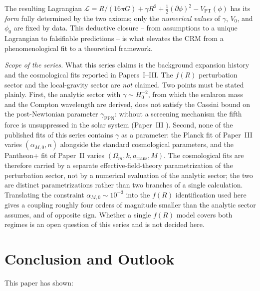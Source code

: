 \documentclass[aps,prd,twocolumn,superscriptaddress,nofootinbib]{revtex4-2}
\begin{document}
The resulting Lagrangian $\mathcal{L} = R/(16\pi G) + \gamma R^2 + \frac{1}{2}(\partial\phi)^2 - V_{\mathrm{PT}}(\phi)$ has its \textit{form} fully determined by the two axioms; only the \textit{numerical values} of $\gamma$, $V_0$, and $\phi_0$ are fixed by data. This deductive closure -- from assumptions to a unique Lagrangian to falsifiable predictions -- is what elevates the CRM from a phenomenological fit to a theoretical framework.

\textit{Scope of the series.} What this series claims is the background expansion history and the cosmological fits reported in Papers~I--III. The $f(R)$ perturbation sector and the local-gravity sector are \textit{not} claimed. Two points must be stated plainly. First, the analytic sector with $\gamma \sim H_0^{-2}$, from which the scalaron mass and the Compton wavelength are derived, does not satisfy the Cassini bound on the post-Newtonian parameter $\gamma_{\mathrm{PPN}}$: without a screening mechanism the fifth force is unsuppressed in the solar system (Paper~III \cite{Geiger2026c}). Second, none of the published fits of this series contains $\gamma$ as a parameter: the Planck fit of Paper~III varies $(\alpha_{M,0}, n)$ alongside the standard cosmological parameters, and the Pantheon+ fit of Paper~II varies $(\Omega_m, k, a_{\mathrm{trans}}, M)$. The cosmological fits are therefore carried by a separate effective-field-theory parametrization of the perturbation sector, not by a numerical evaluation of the analytic sector; the two are distinct parametrizations rather than two branches of a single calculation. Translating the constraint $\alpha_{M,0} \sim 10^{-3}$ into the $f(R)$ identification used here gives a coupling roughly four orders of magnitude smaller than the analytic sector assumes, and of opposite sign. Whether a single $f(R)$ model covers both regimes is an open question of this series and is not decided here.


\section{Conclusion and Outlook}
\label{sec:conclusion}

This paper has shown:
\end{document}
